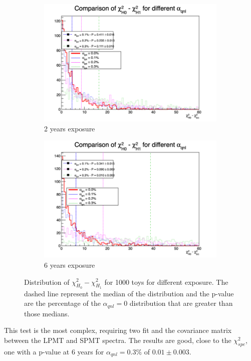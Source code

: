\documentclass[../main.tex]{subfiles}
\begin{document}
\begin{figure}[th]
  \begin{subfigure}[t]{0.48\linewidth}
    \includegraphics[width=\linewidth]{images/joint_fit/stat_tests/chi2_H_2y.png}
    \caption{2 years exposure}
  \end{subfigure}
  \begin{subfigure}[t]{0.48\linewidth}
    \includegraphics[width=\linewidth]{images/joint_fit/stat_tests/chi2_H_6y.png}
    \caption{6 years exposure}
  \end{subfigure}
  \caption{Distribution of $\chi^2_{H_0} - \chi^2_{H_1}$ for 1000 toys for different exposure. The dashed line represent the median of the distribution and the p-value are the percentage of the $\alpha_{qnl} = 0$ distribution that are greater than those medians.}
  \label{fig:joint_fit:chi2_H}
\end{figure}

This test is the most complex, requiring two fit and the covariance matrix between the LPMT and SPMT spectra. The results are good, close to the $\chi^2_{spe}$, one with a p-value at 6 years for $\alpha_{qnl} = 0.3\%$ of $0.01 \pm 0.003$.
\end{document}
